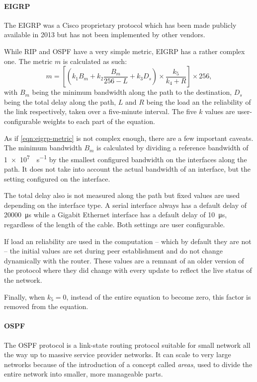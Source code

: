 \paragraph{\acf{EIGRP}}
The \acl{EIGRP} was a Cisco proprietary protocol which has been made publicly available in 2013 but has not been implemented by other vendors.

While \acs{RIP} and \acs{OSPF} have a very simple metric, \acs{EIGRP} has a rather complex one.
The metric $m$ is calculated as such:
\begin{equation}
m = \left[\left(k_1 B_m  + k_2 \frac{B_m}{256-L} + k_3 D_s\right) \times \frac{k_5}{k_4 + R}\right] \times 256,
\label{eqn:eigrp-metric}
\end{equation}
with $B_m$ being the minimum bandwidth along the path to the destination, $D_s$ being the total delay along the path, $L$ and $R$ being the load an the reliability of the link respectively, taken over a five-minute interval.
The five $k$ values are user-configurable weights to each part of the equation.

As if \cref{eqn:eigrp-metric} is not complex enough, there are a few important caveats.
The minimum bandwidth $B_m$ is calculated by dividing a reference bandwidth of \SI{1e7}{\bit\per\second} by the smallest configured bandwidth on the interfaces along the path.
It does not take into account the actual bandwidth of an interface, but the setting configured on the interface.

The total delay also is not measured along the path but fixed values are used depending on the interface type.
A serial interface always has a default delay of \SI{20000}{\micro\second} while a Gigabit Ethernet interface has a default delay of \SI{10}{\micro\second}, regardless of the length of the cable.
Both settings are user configurable.

If load an reliability are used in the computation -- which by default they are not -- the initial values are set during peer establishment and do not change dynamically with the router.
These values are a remnant of an older version of the protocol where they did change with every update to reflect the live status of the network.

Finally, when $k_5=0$, instead of the entire equation to become zero, this factor is removed from the equation.

\paragraph{\acf{OSPF}}
The \acl{OSPF} protocol is a link-state routing protocol suitable for small network all the way up to massive service provider networks.
It can scale to very large networks because of the introduction of a concept called \emph{areas}, used to divide the entire network into smaller, more manageable parts.

